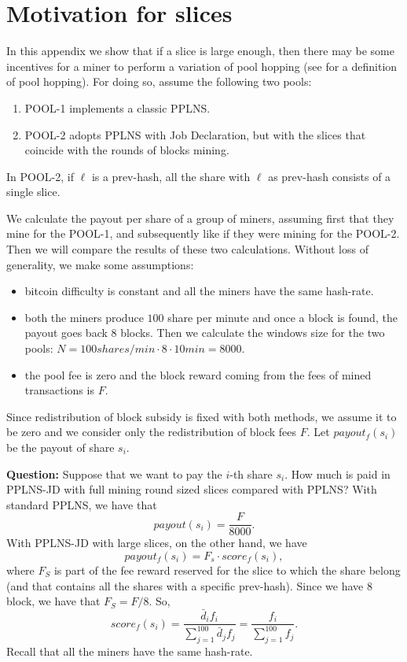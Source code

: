 \documentclass[10pt]{article}
\begin{document}
\appendix
\section{Motivation for slices}
In this appendix we show that if a slice is large enough, then there may be some incentives for a miner to perform a variation of pool hopping (see \cite{rosenfeld} for a definition of pool hopping). For doing so, assume the following two pools:
\begin{enumerate}
	\item POOL-1 implements a classic PPLNS.
	\item POOL-2 adopts PPLNS with Job Declaration, but with the slices that coincide with the rounds of blocks mining.
\end{enumerate}
In POOL-2, if $\ell$ is a prev-hash, all the share with $\ell$ as prev-hash consists of a single slice.

We calculate the payout per share of a group of miners, assuming first that they mine for the POOL-1, and subsequently like if they were mining for the POOL-2. Then we will compare the results of these two calculations. Without loss of generality, we make some assumptions:
\begin{itemize}
	\item bitcoin difficulty is constant and all the miners have the same hash-rate.
	\item both the miners produce $100$ share per minute and once a block is found, the payout goes back $8$ blocks. Then we calculate the windows size for the two pools: $N = 100 shares/min \cdot 8 \cdot 10min = 8000$.
	\item the pool fee is zero and the block reward coming from the fees of mined transactions is $F$. 
	
\end{itemize}
Since redistribution of block subsidy is fixed with both methods, we assume it to be zero and we consider only the redistribution of block fees $F$.
Let $payout_f(s_i)$ be the payout of share $s_i$.

\textbf{Question:} Suppose that we want to pay the $i$-th share $s_i$. How much is paid in PPLNS-JD with full mining round sized slices compared with PPLNS?
With standard PPLNS, we have that
\[payout(s_i) = \frac{F}{8000}.\]
With PPLNS-JD with large slices, on the other hand, we have
\[payout_f(s_i) = F_s\cdot score_f(s_i),\]
where $F_S$ is part of the fee reward reserved for the slice to which the share belong (and that contains all the shares with a specific prev-hash). Since we have $8$ block, we have that $F_S = F/8$. So,
\[score_f(s_i) = \frac{\bar d_i f_i}{\sum_{j=1}^{100} \bar d_j f_j}= \frac{ f_i}{\sum_{j=1}^{100} f_j}. \]
Recall that all the miners have the same hash-rate.
\end{document}
